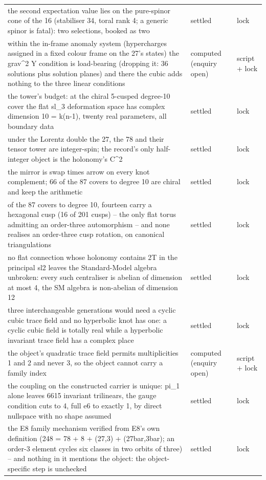 \documentclass[11pt,a4paper]{article}
\theoremstyle{definition}
\theoremstyle{remark}
\begin{document}
\begin{longtable}{@{}p{9.2cm}p{2.9cm}p{2.0cm}@{}}
the second expectation value lies on the pure-spinor cone of the 16 (stabiliser 34, toral rank 4; a generic spinor is fatal): two selections, booked as two & settled & lock \\
within the in-frame anomaly system (hypercharges assigned in a fixed colour frame on the 27's states) the grav\^{}2 Y condition is load-bearing (dropping it: 36 solutions plus solution planes) and there the cubic adds nothing to the three linear conditions & computed (enquiry open) & script + lock \\
the tower's budget: at the chiral 5-cusped degree-10 cover the flat sl\_3 deformation space has complex dimension 10 = k(n-1), twenty real parameters, all boundary data & settled & lock \\
under the Lorentz double the 27, the 78 and their tensor tower are integer-spin; the record's only half-integer object is the holonomy's C\^{}2 & settled & lock \\
the mirror is swap times arrow on every knot complement; 66 of the 87 covers to degree 10 are chiral and keep the arithmetic & settled & lock \\
of the 87 covers to degree 10, fourteen carry a hexagonal cusp (16 of 201 cusps) -- the only flat torus admitting an order-three automorphism -- and none realises an order-three cusp rotation, on canonical triangulations & settled & lock \\
no flat connection whose holonomy contains 2T in the principal sl2 leaves the Standard-Model algebra unbroken: every such centraliser is abelian of dimension at most 4, the SM algebra is non-abelian of dimension 12 & settled & lock \\
three interchangeable generations would need a cyclic cubic trace field and no hyperbolic knot has one: a cyclic cubic field is totally real while a hyperbolic invariant trace field has a complex place & settled & lock \\
the object's quadratic trace field permits multiplicities 1 and 2 and never 3, so the object cannot carry a family index & computed (enquiry open) & script + lock \\
the coupling on the constructed carrier is unique: pi\_1 alone leaves 6615 invariant trilinears, the gauge condition cuts to 4, full e6 to exactly 1, by direct nullspace with no shape assumed & settled & lock \\
the E8 family mechanism verified from E8's own definition (248 = 78 + 8 + (27,3) + (27bar,3bar); an order-3 element cycles six classes in two orbits of three) -- and nothing in it mentions the object: the object-specific step is unchecked & settled & lock \\

\end{longtable}
\end{document}
